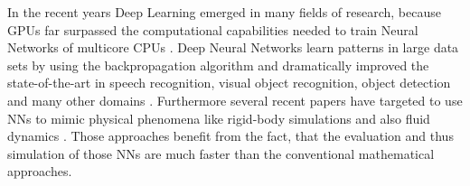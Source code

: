 \par In the recent years Deep Learning emerged in many fields of research, because GPUs far surpassed the computational capabilities needed to train Neural Networks of multicore CPUs \parencite{raina2009large}. Deep Neural Networks learn patterns in large data sets by using the backpropagation algorithm and dramatically improved the state-of-the-art in speech recognition, visual object recognition, object detection and many other domains \parencite{lecun2015deep}. Furthermore several recent papers have targeted to use NNs to mimic physical phenomena like rigid-body simulations \parencite{chang2016compositional} and also fluid dynamics \parencite{tompson2017accelerating}  \parencite{chu2017data} \parencite{schenck2018spnets}. Those approaches benefit from the fact, that the evaluation and thus simulation of those NNs are much faster than the conventional mathematical approaches.